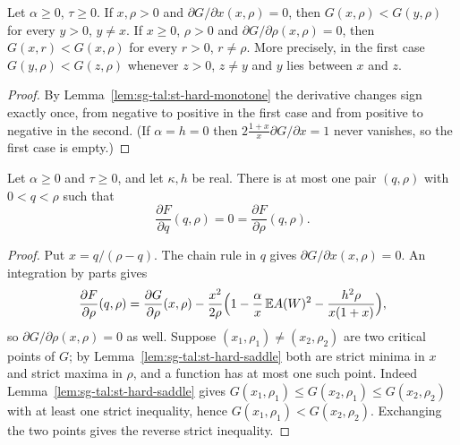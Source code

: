 \begin{lemma}\label{lem:sg-tal:st-hard-saddle}
  \leanok
Let $\alpha\ge0$, $\tau\ge0$. If $x,\rho>0$ and $\partial G/\partial x(x,\rho)=0$, then $G(x,\rho)<G(y,\rho)$ for
every $y>0$, $y\ne x$. If $x\ge0$, $\rho>0$ and $\partial G/\partial\rho(x,\rho)=0$, then $G(x,r)<G(x,\rho)$ for
every $r>0$, $r\ne\rho$. More precisely, in the first case $G(y,\rho)<G(z,\rho)$ whenever $z>0$, $z\ne y$ and
$y$ lies between $x$ and $z$.
\end{lemma}
\begin{proof}
  \leanok
By Lemma~\ref{lem:sg-tal:st-hard-monotone} the derivative changes sign exactly once, from negative to positive in
the first case and from positive to negative in the second. (If $\alpha=h=0$ then
$2\frac{1+x}{x}\partial G/\partial x=1$ never vanishes, so the first case is empty.)
\end{proof}

\begin{theorem}\label{thm:sg-tal:st-hard-uniqueness}
  \leanok
Let $\alpha\ge0$ and $\tau\ge0$, and let $\kappa,h$ be real. There is at most one pair $(q,\rho)$ with
$0<q<\rho$ such that
\[
\frac{\partial F}{\partial q}(q,\rho)=0=\frac{\partial F}{\partial\rho}(q,\rho).
\]
\end{theorem}
\begin{proof}
  \leanok
Put $x=q/(\rho-q)$. The chain rule in $q$ gives $\partial G/\partial x(x,\rho)=0$. An integration by parts gives
\[
\frac{\partial F}{\partial\rho}(q,\rho)
=\frac{\partial G}{\partial\rho}(x,\rho)-\frac{x^2}{2\rho}\Bigl(1-\frac\alpha x\,\mathbb EA(W)^2
-\frac{h^2\rho}{x(1+x)}\Bigr),
\]
so $\partial G/\partial\rho(x,\rho)=0$ as well. Suppose $(x_1,\rho_1)\ne(x_2,\rho_2)$ are two critical points of
$G$; by Lemma~\ref{lem:sg-tal:st-hard-saddle} both are strict minima in $x$ and strict maxima in $\rho$, and a
function has at most one such point. Indeed Lemma~\ref{lem:sg-tal:st-hard-saddle} gives
$G(x_1,\rho_1)\le G(x_2,\rho_1)\le G(x_2,\rho_2)$ with at least one strict inequality, hence
$G(x_1,\rho_1)<G(x_2,\rho_2)$. Exchanging the two points gives the reverse strict inequality.
\end{proof}


